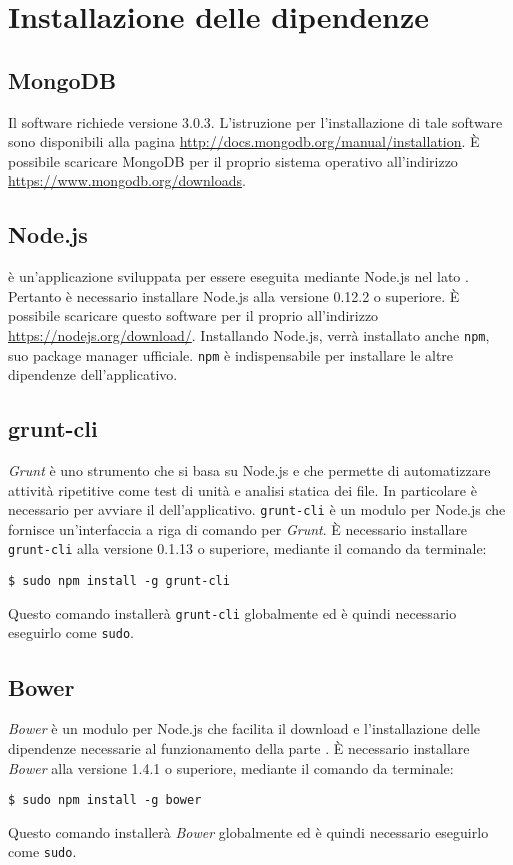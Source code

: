 \section{Installazione delle dipendenze}\label{dipendenze}
\subsection{MongoDB}
Il software richiede  versione 3.0.3. L'istruzione per l'installazione di tale software sono disponibili alla pagina \url{http://docs.mongodb.org/manual/installation}. \`{E} possibile scaricare MongoDB per il proprio sistema operativo all'indirizzo \url{https://www.mongodb.org/downloads}.
\subsection{Node.js}
\Premi è un'applicazione sviluppata per essere eseguita mediante Node.js nel lato . Pertanto è necessario installare Node.js alla versione 0.12.2 o superiore. \`{E} possibile scaricare questo software per il proprio  all'indirizzo \url{https://nodejs.org/download/}. Installando Node.js, verrà installato anche \texttt{npm}, suo package manager ufficiale. \texttt{npm} è indispensabile per installare le altre dipendenze dell'applicativo.
\subsection{grunt-cli}
\textit{Grunt} è uno strumento che si basa su Node.js e che permette di automatizzare attività ripetitive come test di unità e analisi statica dei file. In particolare è necessario per avviare il  dell'applicativo. \texttt{grunt-cli} è un modulo per Node.js che fornisce un'interfaccia a riga di comando per \textit{Grunt}. \`{E} necessario installare \texttt{grunt-cli} alla versione 0.1.13 o superiore, mediante  il comando da terminale:
\begin{center}
\texttt{\$ sudo npm install -g grunt-cli}
\end{center}
Questo comando installerà \texttt{grunt-cli} globalmente ed è quindi necessario eseguirlo come \texttt{sudo}.
\subsection{Bower}
\textit{Bower} è un modulo per Node.js che facilita il download e l'installazione delle dipendenze necessarie al funzionamento della parte . \`{E} necessario installare \textit{Bower} alla versione 1.4.1 o superiore, mediante  il comando da terminale:
\begin{center}
\texttt{\$ sudo npm install -g bower}
\end{center}
Questo comando installerà \textit{Bower} globalmente ed è quindi necessario eseguirlo come \texttt{sudo}.
